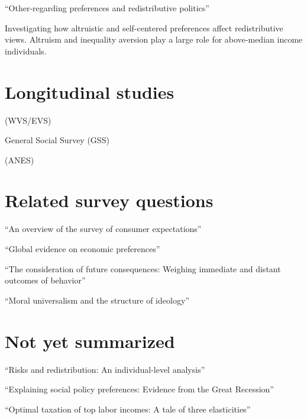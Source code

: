 \documentclass{article}
\begin{document}
\medskip \noindent \textbf{\cite{epper2020other}} ``Other-regarding preferences and redistributive politics''

Investigating how altruistic and self-centered preferences affect redistributive views. Altruism and inequality aversion play a large role for above-median income individuals.


\section*{Longitudinal studies}


\noindent \textbf{\cite{wvs7}} (WVS/EVS)


\medskip \noindent \textbf{\cite{gss2022}} General Social Survey (GSS)

\medskip \noindent \textbf{\cite{anes2020}} (ANES)

\section*{Related survey questions}

\noindent \textbf{\cite{armantier2017overview}} ``An overview of the survey of consumer expectations''

\medskip \noindent \textbf{\cite{falk2018global}} ``Global evidence on economic preferences''

\medskip \noindent \textbf{\cite{strathman1994consideration}} ``The consideration of future consequences: Weighing immediate and distant outcomes of behavior''

\medskip \noindent \textbf{\cite{enke2023moral}} ``Moral universalism and the structure of ideology''


\section*{Not yet summarized}

\noindent \textbf{\cite{rehm2009risks}} ``Risks and redistribution: An individual-level analysis''

\medskip \noindent \textbf{\cite{margalit2013explaining}} ``Explaining social policy preferences: Evidence from the Great Recession''

\medskip \noindent \textbf{\cite{piketty2014optimal}} ``Optimal taxation of top labor incomes: A tale of three elasticities''
\end{document}

